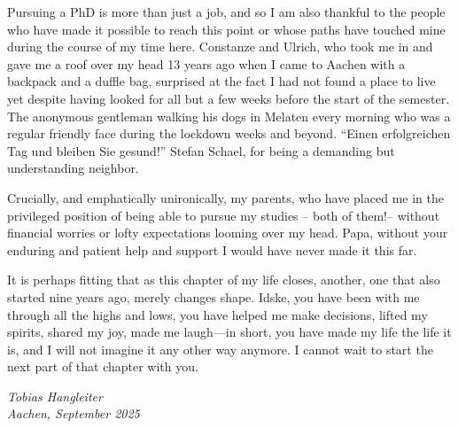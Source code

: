 Pursuing a PhD is more than just a job, and so I am also thankful to the people who have made it possible to reach this point or whose paths have touched mine during the course of my time here.
Constanze and Ulrich, who took me in and gave me a roof over my head 13 years ago when I came to Aachen with a backpack and a duffle bag, surprised at the fact I had not found a place to live yet despite having looked for all but a few weeks before the start of the semester.
The anonymous gentleman walking his dogs in Melaten every morning who was a regular friendly face during the lockdown weeks and beyond.
\enquote{Einen erfolgreichen Tag und bleiben Sie gesund!}
Stefan Schael, for being a demanding but understanding neighbor.

Crucially, and emphatically unironically, my parents, who have placed me in the privileged position of being able to pursue my studies -- both of them!\@ -- without financial worries or lofty expectations looming over my head.
Papa, without your enduring and patient help and support I would have never made it this far.

It is perhaps fitting that as this chapter of my life closes, another, one that also started nine years ago, merely changes shape.
Idske, you have been with me through all the highs and lows, you have helped me make decisions, lifted my spirits, shared my joy, made me laugh---in short, you have made my life the life it is, and I will not imagine it any other way anymore.
I cannot wait to start the next part of that chapter with you.

\begin{flushright}
    \itshape
    Tobias Hangleiter\\
    Aachen, September 2025
\end{flushright}
